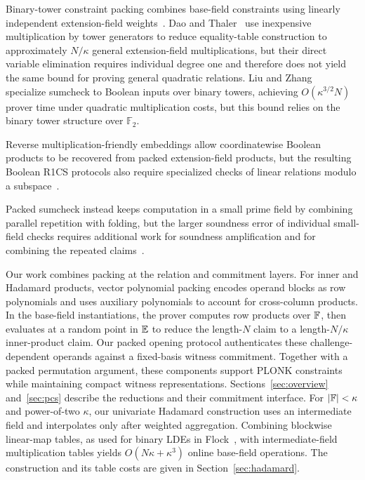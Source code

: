 Binary-tower constraint packing combines base-field constraints
using linearly independent extension-field
weights~\cite{eurocrypt/DiamondP25,iacr/DaoT24}.
Dao and Thaler~\cite{iacr/DaoT24} use inexpensive multiplication
by tower generators to reduce equality-table construction to
approximately \(N/\kappa\) general extension-field multiplications,
but their direct variable elimination requires individual
degree one and therefore does not yield the same bound for
proving general quadratic relations.
Liu and Zhang~\cite{iacr/LiuZ25} specialize sumcheck to Boolean
inputs over binary towers, achieving \(O(\kappa^{3/2}N)\)
prover time under quadratic multiplication costs, but this
bound relies on the binary tower structure over
\(\mathbb{F}_2\).


Reverse multiplication-friendly embeddings allow coordinatewise
Boolean products to be recovered from packed extension-field
products, but the resulting Boolean R1CS protocols also require
specialized checks of linear relations modulo a
subspace~\cite{iacr/CascudoG21}.

Packed sumcheck instead keeps computation in a small prime
field by combining parallel repetition with folding, but
the larger soundness error of individual small-field checks
requires additional work for soundness amplification and
for combining the repeated
claims~\cite{iacr/WeiWXZDWZ25}.


\medskip
{}
Our work combines packing at the relation and commitment layers.
For inner and Hadamard products, vector polynomial packing
encodes operand blocks as row polynomials and uses auxiliary
polynomials to account for cross-column products.
In the base-field instantiations, the prover computes row
products over \({\mathbb{F}}\), then evaluates at a random point in
\(\mathbb{E}\) to reduce
the length-\(N\) claim to a length-\(N/\kappa\) inner-product
claim.
Our packed opening protocol authenticates these
challenge-dependent operands against a fixed-basis witness
commitment.
Together with a packed permutation argument, these components
support PLONK constraints while maintaining compact witness
representations.
Sections~\ref{sec:overview} and~\ref{sec:pcs} describe the
reductions and their commitment interface.
For \(|{\mathbb{F}}|<\kappa\) and power-of-two \(\kappa\), our
univariate Hadamard construction
uses an intermediate field and interpolates only after weighted
aggregation. Combining blockwise linear-map tables, as used for
binary LDEs in Flock~\cite{iacr/BunzRW26}, with intermediate-field
multiplication tables yields \(O(N\kappa+\kappa^3)\) online
base-field operations. The construction and its table costs
are given in Section~\ref{sec:hadamard}.


